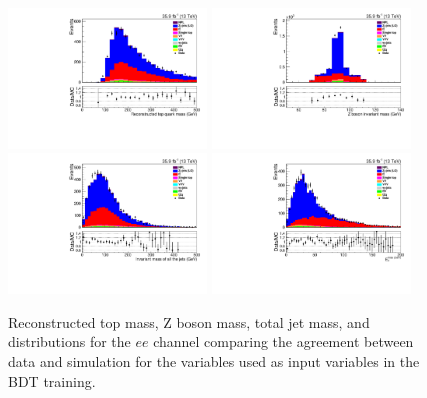 \begin{figure}[h]
\centering
\includegraphics[width=0.47\textwidth]{figs/background-estimation/plots/unblinded/prompt_ee_ttbarInc/topMass_NPL_ee_wMass_ee.pdf}
\includegraphics[width=0.47\textwidth]{figs/background-estimation/plots/unblinded/prompt_ee_ttbarInc/zPairMass_NPL_ee_wMass_ee.pdf}
\\
\includegraphics[width=0.47\textwidth]{figs/background-estimation/plots/unblinded/prompt_ee_ttbarInc/totalJetMass_NPL_ee_wMass_ee.pdf}
\includegraphics[width=0.47\textwidth]{figs/background-estimation/plots/unblinded/prompt_ee_ttbarInc/met_NPL_ee_wMass_ee.pdf}
\caption{
Reconstructed top mass, Z boson mass, total jet mass, and \MET distributions for the $ee$ channel comparing the agreement between data and simulation for the variables used as input variables in the BDT training.}
\label{fig:inputFeaturesDataSimAgreement1}
\end{figure}


